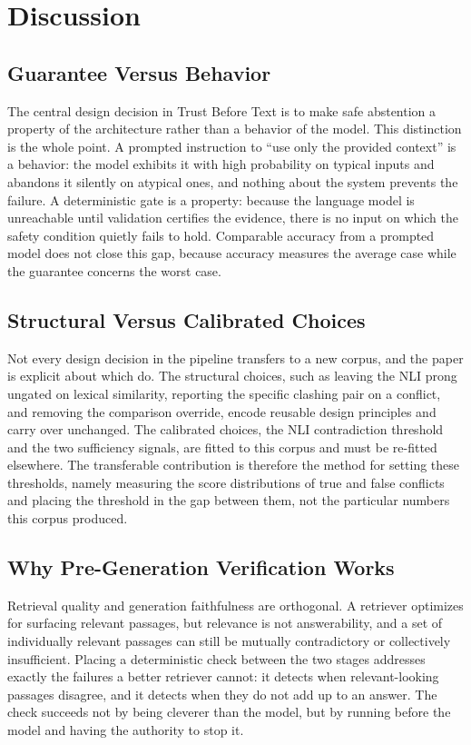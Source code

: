 \documentclass[conference]{IEEEtran}
\begin{document}
\section{Discussion}
\label{sec:discussion}

\subsection{Guarantee Versus Behavior}
The central design decision in Trust Before Text is to make safe abstention
a property of the architecture rather than a behavior of the model. This
distinction is the whole point. A prompted instruction to ``use only the
provided context'' is a behavior: the model exhibits it with high
probability on typical inputs and abandons it silently on atypical ones, and
nothing about the system prevents the failure. A deterministic gate is a
property: because the language model is unreachable until validation
certifies the evidence, there is no input on which the safety condition
quietly fails to hold. Comparable accuracy from a prompted model does not
close this gap, because accuracy measures the average case while the
guarantee concerns the worst case.

\subsection{Structural Versus Calibrated Choices}
Not every design decision in the pipeline transfers to a new corpus, and
the paper is explicit about which do. The structural choices, such as
leaving the NLI prong ungated on lexical similarity, reporting the specific
clashing pair on a conflict, and removing the comparison override, encode
reusable design principles and carry over unchanged. The calibrated
choices, the NLI contradiction threshold and the two sufficiency signals,
are fitted to this corpus and must be re-fitted elsewhere. The transferable
contribution is therefore the method for setting these thresholds, namely
measuring the score distributions of true and false conflicts and placing
the threshold in the gap between them, not the particular numbers this
corpus produced.

\subsection{Why Pre-Generation Verification Works}
Retrieval quality and generation faithfulness are orthogonal. A retriever
optimizes for surfacing relevant passages, but relevance is not
answerability, and a set of individually relevant passages can still be
mutually contradictory or collectively insufficient. Placing a
deterministic check between the two stages addresses exactly the failures a
better retriever cannot: it detects when relevant-looking passages disagree,
and it detects when they do not add up to an answer. The check succeeds not
by being cleverer than the model, but by running before the model and
having the authority to stop it.
\end{document}
